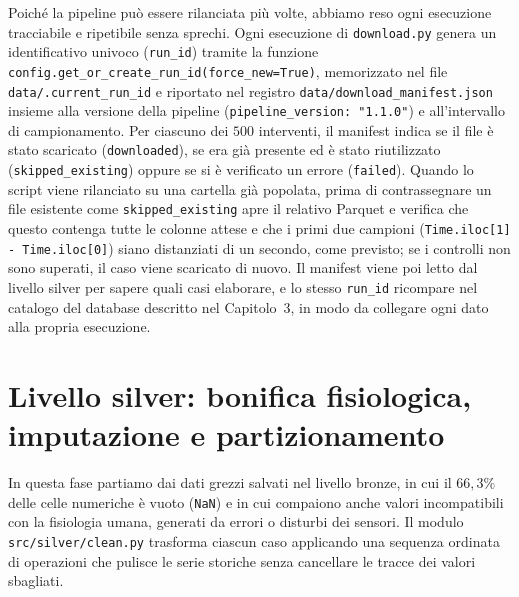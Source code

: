 Poich\'e la pipeline pu\`o essere rilanciata pi\`u volte, abbiamo reso ogni esecuzione tracciabile e ripetibile senza sprechi. Ogni esecuzione di \texttt{download.py} genera un identificativo univoco (\texttt{run\_id}) tramite la funzione \texttt{config.\allowbreak get\_or\_create\_\allowbreak run\_id(\allowbreak force\_new=True)}, memorizzato nel file \texttt{data/\allowbreak .current\_\allowbreak run\_id} e riportato nel registro \texttt{data/\allowbreak download\_\allowbreak manifest.json} insieme alla versione della pipeline (\texttt{pipeline\_version: "1.1.0"}) e all'intervallo di campionamento. Per ciascuno dei $500$ interventi, il manifest indica se il file \`e stato scaricato (\texttt{downloaded}), se era gi\`a presente ed \`e stato riutilizzato (\texttt{skipped\_\allowbreak existing}) oppure se si \`e verificato un errore (\texttt{failed}). Quando lo script viene rilanciato su una cartella gi\`a popolata, prima di contrassegnare un file esistente come \texttt{skipped\_\allowbreak existing} apre il relativo Parquet e verifica che questo contenga tutte le colonne attese e che i primi due campioni (\texttt{Time.iloc[1] - Time.iloc[0]}) siano distanziati di un secondo, come previsto; se i controlli non sono superati, il caso viene scaricato di nuovo. Il manifest viene poi letto dal livello silver per sapere quali casi elaborare, e lo stesso \texttt{run\_id} ricompare nel catalogo del database descritto nel Capitolo~3, in modo da collegare ogni dato alla propria esecuzione.

\section{Livello silver: bonifica fisiologica, imputazione e partizionamento}
In questa fase partiamo dai dati grezzi salvati nel livello bronze, in cui il $66,3\%$ delle celle numeriche \`e vuoto (\texttt{NaN}) e in cui compaiono anche valori incompatibili con la fisiologia umana, generati da errori o disturbi dei sensori. Il modulo \texttt{src/silver/\allowbreak clean.py} trasforma ciascun caso applicando una sequenza ordinata di operazioni che pulisce le serie storiche senza cancellare le tracce dei valori sbagliati.

